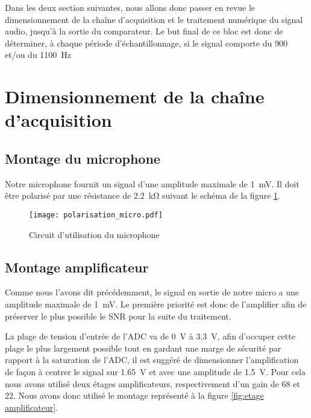 Dans les deux section suivantes, nous allons donc passer en revue le dimensionnement de la chaîne d'acquisition et le traitement numérique du signal audio, jusqu'à la sortie du comparateur. Le but final de ce bloc est donc de déterminer, à chaque période d'échantillonnage, si le signal comporte du 900 et/ou du \SI{1100}{\hertz}

\section{Dimensionnement de la chaîne d'acquisition}

\subsection{Montage du microphone}
Notre microphone fournit un signal d'une amplitude maximale de \SI{1}{\milli\volt}. Il doit être polarisé par une résistance de \SI{2.2}{\kilo\ohm} suivant le schéma de la figure \ref{fig:polarisation du micro}.
\begin{figure}[htbp]
\centering
\texttt{[image: polarisation\_micro.pdf]}
\caption{Circuit d'utilisation du microphone}
\label{fig:polarisation du micro}
\end{figure}

\subsection{Montage amplificateur}
Comme nous l'avons dit précédemment, le signal en sortie de notre micro a une amplitude maximale de \SI{1}{\milli\volt}. Le première priorité est donc de l'amplifier afin de préserver le plus possible le SNR pour la suite du traitement.

La plage de tension d'entrée de l'ADC va de \SI{0}{\volt} à \SI{3.3}{\volt}, afin d'occuper cette plage le plus largement possible tout en gardant une marge de sécurité par rapport à la saturation de l'ADC, il est suggéré de dimensionner l'amplification  de façon à centrer le signal sur \SI{1.65}{\volt} et avec une amplitude de \SI{1.5}{\volt}. Pour cela nous avons utilisé deux étages amplificateurs, respectivement d'un gain de 68 et 22. Nous avons donc utilisé le montage représenté à la figure \ref{fig:etage amplificateur}.

